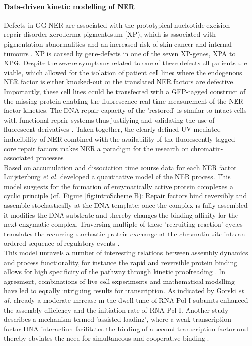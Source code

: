 \paragraph{Data-driven kinetic modelling of NER}
Defects in GG-NER are associated with the prototypical nucleotide-excision-repair disorder xeroderma pigmentosum (XP), which is associated with pigmentation abnormalities and an increased risk of skin cancer and internal tumours \cite{Hoeijmakers2009}. XP is caused by gene-defects in one of the seven XP-genes, XPA to XPG. Despite the severe symptoms related to one of these defects all patients are viable, which allowed for the isolation of patient cell lines where the endogenous NER factor is either knocked-out or the translated NER factors are defective. Importantly, these cell lines could be transfected with a GFP-tagged construct of the missing protein enabling the fluorescence real-time measurement of the NER factor kinetics. The DNA repair-capacity of the 'restored' is similar to intact cells with functional repair systems thus justifying and validating the use of fluorescent derivatives \cite{Hoogstraten2002,Hoogstraten2008,Zotter2006,Rademakers2003}. Taken together, the clearly defined UV-mediated inducibility of NER combined with the availability of the fluorescently-tagged core repair factors makes NER a paradigm for the research on chromatin-associated processes.\\
Based on accumulation and dissociation time course data for each NER factor Luijsterburg \textit{et al.}\cite{Luijsterburg2010} developed a quantitative model of the NER process. This model suggests for the formation of enzymatically active protein complexes a cyclic principle (cf.\ Figure \ref{fig:introScheme}B): Repair factors bind reversibly and assemble stochastically at the DNA template; once the complex is fully assembled it modifies the DNA substrate and thereby changes the binding affinity for the next enzymatic complex. Traversing multiple of these 'recruiting-reaction' cycles translates the recurring stochastic protein exchange at the chromatin site into an ordered sequence of regulatory events \cite{Dinant:2009:J-Cell-Biol:19332890}.\\
This model unravels a number of interesting relations between assembly dynamics and process functionality, for instance the rapid and reversible protein binding allows for high specificity of the pathway through kinetic proofreading \cite{Luijsterburg2010}. In agreement, combinations of live cell experiments and mathematical modelling have led to equally intriguing results for transcription. As indicated by Gorski \textit{et al.} \cite{Gorski:2008:Mol-Cell:18498750} already a moderate increase in the dwell-time of RNA Pol I subunits enhanced the assembly efficiency and the initiation rate of RNA Pol I. Another study describes a mechanism termed 'assisted loading', where a weak transcription factor-DNA interaction facilitates the binding of a second transcription factor and thereby obviates the need for simultaneous and cooperative binding \cite{Voss2011}. \\         
